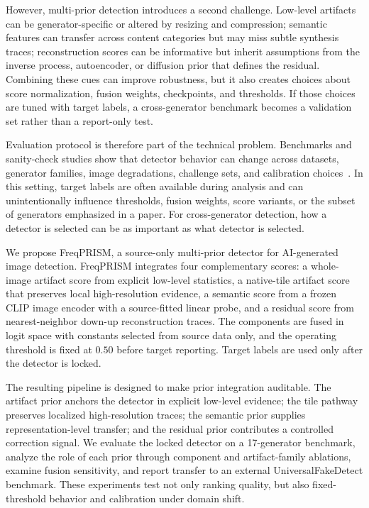 \documentclass[lettersize,journal]{IEEEtran}
\begin{document}
However, multi-prior detection introduces a second challenge. Low-level artifacts can be generator-specific or altered by resizing and compression; semantic features can transfer across content categories but may miss subtle synthesis traces; reconstruction scores can be informative but inherit assumptions from the inverse process, autoencoder, or diffusion prior that defines the residual. Combining these cues can improve robustness, but it also creates choices about score normalization, fusion weights, checkpoints, and thresholds. If those choices are tuned with target labels, a cross-generator benchmark becomes a validation set rather than a report-only test.

Evaluation protocol is therefore part of the technical problem. Benchmarks and sanity-check studies show that detector behavior can change across datasets, generator families, image degradations, challenge sets, and calibration choices~\cite{yan2023deepfakebench,zhu2023genimage,yan2025aide,li2025rrdataset,yang2026calibrated}. In this setting, target labels are often available during analysis and can unintentionally influence thresholds, fusion weights, score variants, or the subset of generators emphasized in a paper. For cross-generator detection, how a detector is selected can be as important as what detector is selected.

We propose FreqPRISM, a source-only multi-prior detector for AI-generated image detection. FreqPRISM integrates four complementary scores: a whole-image artifact score from explicit low-level statistics, a native-tile artifact score that preserves local high-resolution evidence, a semantic score from a frozen CLIP image encoder with a source-fitted linear probe, and a residual score from nearest-neighbor down-up reconstruction traces. The components are fused in logit space with constants selected from source data only, and the operating threshold is fixed at $0.50$ before target reporting. Target labels are used only after the detector is locked.

The resulting pipeline is designed to make prior integration auditable. The artifact prior anchors the detector in explicit low-level evidence; the tile pathway preserves localized high-resolution traces; the semantic prior supplies representation-level transfer; and the residual prior contributes a controlled correction signal. We evaluate the locked detector on a 17-generator benchmark, analyze the role of each prior through component and artifact-family ablations, examine fusion sensitivity, and report transfer to an external UniversalFakeDetect benchmark. These experiments test not only ranking quality, but also fixed-threshold behavior and calibration under domain shift.
\end{document}
